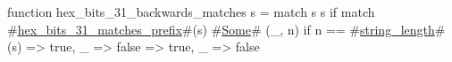 function hex_bits_31_backwards_matches s = match s {
  s if match #\hyperref[sailRISCVzhexzybitszy31zymatcheszyprefix]{hex\_bits\_31\_matches\_prefix}#(s) {
    #\hyperref[sailRISCVzSome]{Some}# (_, n) if n == #\hyperref[sailRISCVzstringzylength]{string\_length}#(s) => true,
    _ => false
  } => true,
  _ => false
}
